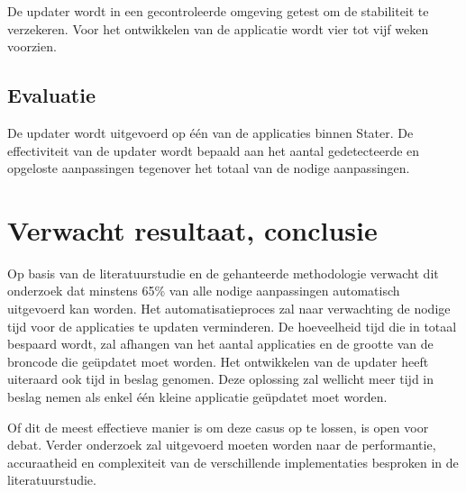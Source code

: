 De updater wordt in een gecontroleerde omgeving getest om de stabiliteit te verzekeren.
Voor het ontwikkelen van de applicatie wordt vier tot vijf weken voorzien.

\subsection{Evaluatie}

De updater wordt uitgevoerd op één van de applicaties binnen Stater.
De effectiviteit van de updater wordt bepaald aan het aantal gedetecteerde en opgeloste aanpassingen tegenover het totaal van de nodige aanpassingen.

\section{Verwacht resultaat, conclusie}
\label{sec:verwachte_resultaten}

Op basis van de literatuurstudie en de gehanteerde methodologie verwacht dit onderzoek dat minstens 65\% van alle nodige aanpassingen automatisch uitgevoerd kan worden.
Het automatisatieproces zal naar verwachting de nodige tijd voor de applicaties te updaten verminderen.
De hoeveelheid tijd die in totaal bespaard wordt, zal afhangen van het aantal applicaties en de grootte van de broncode die geüpdatet moet worden.
Het ontwikkelen van de updater heeft uiteraard ook tijd in beslag genomen.
Deze oplossing zal wellicht meer tijd in beslag nemen als enkel één kleine applicatie geüpdatet moet worden.

Of dit de meest effectieve manier is om deze casus op te lossen, is open voor debat.
Verder onderzoek zal uitgevoerd moeten worden naar de performantie, accuraatheid en complexiteit van de verschillende implementaties besproken in de literatuurstudie.

